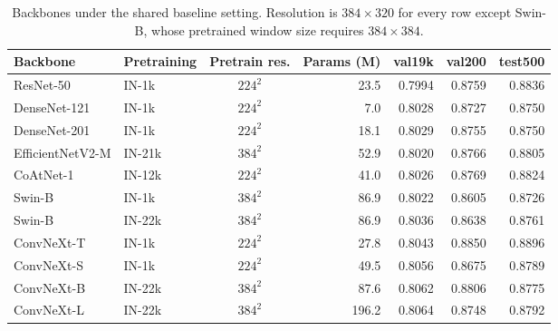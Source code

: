 
\begin{table}[H]
  \caption{Backbones under the shared baseline setting. Resolution is
  $384\times320$ for every row except Swin-B, whose pretrained window size
  requires $384\times384$.}
  \centering
  \begin{tabular}{llcrrrr}
    \toprule
    Backbone & Pretraining & Pretrain res. & Params (M) & val19k & val200 & test500 \\
    \midrule
    ResNet-50 & IN-1k & $224^2$ & 23.5 & 0.7994 & 0.8759 & 0.8836 \\
    DenseNet-121 & IN-1k & $224^2$ & 7.0 & 0.8028 & 0.8727 & 0.8750 \\
    DenseNet-201 & IN-1k & $224^2$ & 18.1 & 0.8029 & 0.8755 & 0.8750 \\
    EfficientNetV2-M & IN-21k & $384^2$ & 52.9 & 0.8020 & 0.8766 & 0.8805 \\
    CoAtNet-1 & IN-12k & $224^2$ & 41.0 & 0.8026 & 0.8769 & 0.8824 \\
    Swin-B & IN-1k & $384^2$ & 86.9 & 0.8022 & 0.8605 & 0.8726 \\
    Swin-B & IN-22k & $384^2$ & 86.9 & 0.8036 & 0.8638 & 0.8761 \\
    ConvNeXt-T & IN-1k & $224^2$ & 27.8 & 0.8043 & 0.8850 & 0.8896 \\
    ConvNeXt-S & IN-1k & $224^2$ & 49.5 & 0.8056 & 0.8675 & 0.8789 \\
    ConvNeXt-B & IN-22k & $384^2$ & 87.6 & 0.8062 & 0.8806 & 0.8775 \\
    ConvNeXt-L & IN-22k & $384^2$ & 196.2 & 0.8064 & 0.8748 & 0.8792 \\
    \bottomrule
  \end{tabular}
  \label{tab:arch}
\end{table}
